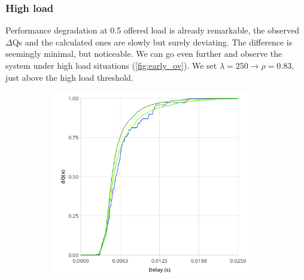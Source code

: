 \subsubsection{High load}
    Performance degradation at 0.5 offered load is already remarkable, the observed $\Delta$Qs and the calculated ones are slowly but surely deviating. The difference is seemingly minimal, but noticeable. We can go even further and observe the system under high load situations (\cref{fig:early_ov}). We set $\lambda = 250 \rightarrow \rho = 0.83$, just above the high load threshold.
    
       \begin{figure}[H]
            \centering
            \begin{subfigure}{.5\textwidth}
                \centering
                \includegraphics[width=0.98\textwidth]{img/overload_2/250_worker.png}
                \label{fig:high_load_1}
            \end{subfigure}%
            \begin{subfigure}{.5\textwidth}
                \centering

\end{subfigure}
\end{figure}
